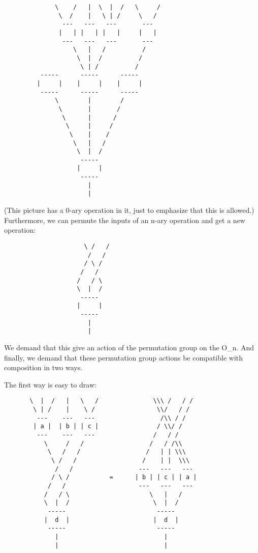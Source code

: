 \begin{verbatim}
              \    /   |  \  |  /   \     / 
               \  /    |   \ | /     \   / 
                ---   ---   ---       ---
               |   | |   | |   |     |   |
                ---   ---   ---       ---
                   \   |   /          /
                    \  |  /          / 
                     \ | /          / 
          -----      -----      -----
         |     |    |     |    |     |
          -----      -----      -----
              \        |        /  
               \       |       /   
                \      |      /
                 \     |     / 
                  \    |    / 
                   \   |   /   
                    \  |  /
                     -----
                    |     | 
                     -----
                       |
                       |
\end{verbatim}
    
(This picture has a 0-ary operation in it, just to emphasize that this
is allowed.)  Furthermore, we can permute the inputs of an n-ary
operation and get a new operation:
                      
\begin{verbatim}
                      \ /   /
                       /   /
                      / \ /    
                     /   /   
                    /   / \
                    \  |  /
                     -----
                    |     | 
                     -----
                       |
                       |
\end{verbatim}
    

We demand that this give an action of the permutation group on the
O_{n}.  And finally, we demand that these permutation group
actions be compatible with composition in two ways.

The first way is easy to draw:

\begin{verbatim}
       \  |  /   |   \   /               \\\ /   / /
        \ | /    |    \ /                 \\/   / /
         ---    ---   ---                  /\\ / /
        | a |  | b | | c |                / \\/ /
         ---    ---   ---                /   / /
           \     /   /                  /   / /\\
            \   /   /                  /   | | \\\  
             \ /   /                  /    | |  \\\
              /   /                  ---   ---   ---
             / \ /           =      | b | | c | | a |
            /   /                    ---   ---   ---
           /   / \                      \   |   /
           \  |  /                       \  |  /
            -----                         -----
           |  d  |                       |  d  | 
            -----                         -----
              |                             |
              |                             |
\end{verbatim}
    
